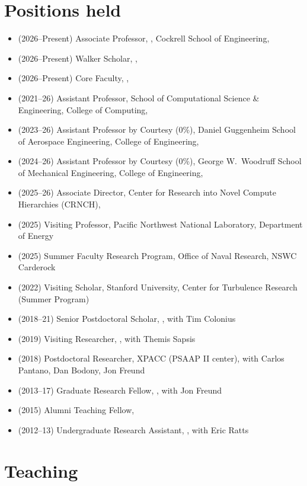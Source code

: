\section{Positions held}

\begin{itemize}
    \item (2026--Present) Associate Professor, \Walker, Cockrell School of Engineering, \UTA
    \item (2026--Present) Walker Scholar, \Walker, \UTA
    \item (2026--Present) Core Faculty, \Oden, \UTA
    \item (2021--26) Assistant Professor, School of Computational Science \& Engineering, College of Computing, \GIT
    \item (2023--26) Assistant Professor by Courtesy (0\%), Daniel Guggenheim School of Aerospace Engineering, College of Engineering, \GIT
    \item (2024--26) Assistant Professor by Courtesy (0\%), George W.\ Woodruff School of Mechanical Engineering, College of Engineering, \GIT
    \item (2025--26) Associate Director, Center for Research into Novel Compute Hierarchies (CRNCH), \GIT
    \item (2025) Visiting Professor, Pacific Northwest National Laboratory, Department of Energy
    \item (2025) Summer Faculty Research Program, Office of Naval Research, NSWC Carderock
    \item (2022) Visiting Scholar, Stanford University, Center for Turbulence Research (Summer Program)
    \item (2018--21) Senior Postdoctoral Scholar, \CIT, with Tim Colonius
    \item (2019) Visiting Researcher, \MIT, with Themis Sapsis
    \item (2018) Postdoctoral Researcher, XPACC (PSAAP II center), with Carlos Pantano, Dan Bodony, Jon Freund
    \item (2013--17) Graduate Research Fellow, \UIUC, with Jon Freund
    \item (2015) Alumni Teaching Fellow, \UIUC
    \item (2012--13) Undergraduate Research Assistant, \UMD, with Eric Ratts
\end{itemize}

\section{Teaching}

